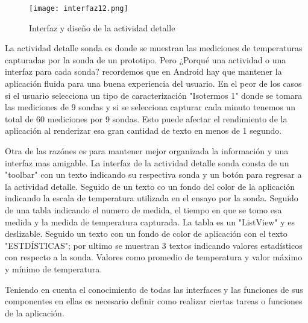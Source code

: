 \begin{figure}[H]
	\centering
	\texttt{[image: interfaz12.png]}
	\caption{Interfaz y diseño de la actividad detalle}
\end{figure}

\par \noindent
La actividad detalle sonda es donde se muestran las mediciones de temperaturas capturadas por la sonda de un prototipo. Pero ¿Porqué una actividad o una interfaz para cada sonda? recordemos que en Android hay que mantener la aplicación fluida para una buena experiencia del usuario. En el peor de los casos si el usuario selecciona un tipo de caracterización "Isotermos 1" donde se tomara las mediciones de 9 sondas y si se selecciona capturar cada minuto tenemos un total de 60 mediciones por 9 sondas. Esto puede afectar el rendimiento de la aplicación al renderizar esa gran cantidad de texto en menos de 1 segundo.

\par \noindent
Otra de las razónes es para mantener mejor organizada la información y una interfaz mas amigable. La interfaz de la actividad detalle sonda consta de un "toolbar" con un texto indicando su respectiva sonda y un botón para regresar a la actividad detalle. Seguido de un texto co un fondo del color de la aplicación indicando la escala de temperatura utilizada en el ensayo por la sonda. Seguido de una tabla indicando el numero de medida, el tiempo en que se tomo esa medida y la medida de temperatura capturada. La tabla es un "ListView" y es deslizable. Seguido un texto con un fondo de color de aplicación con el texto "ESTDÍSTICAS"; por ultimo se muestran 3 textos indicando valores estadísticos con respecto a la sonda. Valores como promedio de temperatura y valor máximo y mínimo de temperatura.

\par \noindent
Teniendo en cuenta el conocimiento de todas las interfaces y las funciones de sus componentes en ellas es necesario definir como realizar ciertas tareas o funciones de la aplicación. 